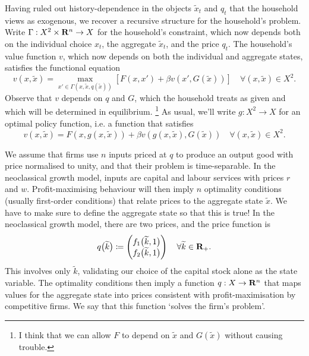 \documentclass[11pt,letterpaper,reqno,oneside]{article}
\begin{document}
Having ruled out history-dependence in the objects $\widetilde{x}_t$ and $q_t$ that the household views as exogenous, we recover a recursive structure for the household's problem. Write $\Gamma : X^2 \times \mathbf{R}^n \to X$ for the household's constraint, which now depends both on the individual choice $x_t$, the aggregate $\widetilde{x}_t$, and the price $q_t$. The household's value function $v$, which now depends on both the individual and aggregate states, satisfies the functional equation
%
\begin{equation}
	v \left( x, \widetilde{x} \right)
	= \max_{ x' \in \Gamma\left( x, \widetilde{x}, q\left( \widetilde{x} \right) \right) } 
	\left[
	F\left( x, x' \right) + \beta v\left( x', G\left(\widetilde{x}\right) \right)
	\right] 
	\quad\forall \left(x,\widetilde{x}\right) \in X^2 .
	\label{eq:RCE_functional_eqn}
\end{equation}
%
Observe that $v$ depends on $q$ and $G$, which the household treats as given and which will be determined in equilibrium.%
	\footnote{I think that we can allow $F$ to depend on $\widetilde{x}$ and $G\left( \widetilde{x} \right)$ without causing trouble.}
As usual, we'll write $g : X^2 \to X$ for an optimal policy function, i.e. a function that satisfies
%
\begin{equation}
	v \left( x, \widetilde{x} \right)
	= 
	F\left( x, g\left(x,\widetilde{x}\right) \right) 
	+ \beta v\left( g\left(x,\widetilde{x}\right), 
	G\left(\widetilde{x}\right) \right) 
	\quad\forall \left(x,\widetilde{x}\right) \in X^2 .
	\label{eq:RCE_g}
\end{equation}


We assume that firms use $n$ inputs priced at $q$ to produce an output good with price normalised to unity, and that their problem is time-separable. In the neoclassical growth model, inputs are capital and labour services with prices $r$ and $w$. Profit-maximising behaviour will then imply $n$ optimality conditions (usually first-order conditions) that relate prices to the aggregate state $\widetilde{x}$. We have to make sure to define the aggregate state so that this is true! In the neoclassical growth model, there are two prices, and the price function is
%
\begin{equation*}
	q\bigl( \widetilde{k} \bigr)
	\coloneqq
	\begin{pmatrix}
		f_1\bigl( \widetilde{k}, 1 \bigr) \\
		f_2\bigl( \widetilde{k}, 1 \bigr)
	\end{pmatrix} 
	\quad\forall \widetilde{k} \in \mathbf{R}_+ .
\end{equation*}
%
This involves only $\widetilde{k}$, validating our choice of the capital stock alone as the state variable. The optimality conditions then imply a function $q : X \to \mathbf{R}^n$ that maps values for the aggregate state into prices consistent with profit-maximisation by competitive firms. We say that this function `solves the firm's problem'.
\end{document}
